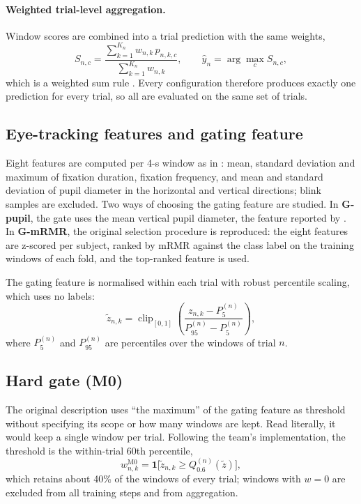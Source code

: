 \documentclass[11pt,a4paper]{article}
\begin{document}
\paragraph{Weighted trial-level aggregation.} Window scores are combined into a trial prediction with the same weights,
\begin{equation}
S_{n,c} = \frac{\sum_{k=1}^{K_n} w_{n,k}\,p_{n,k,c}}{\sum_{k=1}^{K_n} w_{n,k}},\qquad \hat y_n = \arg\max_{c} S_{n,c},
\label{eq:agg}
\end{equation}
which is a weighted sum rule \cite{Kittler1998}. Every configuration therefore produces exactly one prediction for every trial, so all are evaluated on the same set of trials.

\subsection{Eye-tracking features and gating feature}
Eight features are computed per 4-s window as in \cite{FarhadiSedehi2024a}: mean, standard deviation and maximum of fixation duration, fixation frequency, and mean and standard deviation of pupil diameter in the horizontal and vertical directions; blink samples are excluded. Two ways of choosing the gating feature are studied. In \textbf{G-pupil}, the gate uses the mean vertical pupil diameter, the feature reported by \cite{FarhadiSedehi2024a}. In \textbf{G-mRMR}, the original selection procedure is reproduced: the eight features are z-scored per subject, ranked by mRMR against the class label on the training windows of each fold, and the top-ranked feature is used.

The gating feature is normalised within each trial with robust percentile scaling, which uses no labels:
\begin{equation}
\tilde z_{n,k} = \operatorname{clip}_{[0,1]}\left(\frac{z_{n,k}-P_{5}^{(n)}}{P_{95}^{(n)}-P_{5}^{(n)}}\right),
\label{eq:norm}
\end{equation}
where $P_{5}^{(n)}$ and $P_{95}^{(n)}$ are percentiles over the windows of trial $n$.

\subsection{Hard gate (M0)}
The original description uses ``the maximum'' of the gating feature as threshold without specifying its scope or how many windows are kept. Read literally, it would keep a single window per trial. Following the team's implementation, the threshold is the within-trial 60th percentile,
\begin{equation}
w^{\mathrm{M0}}_{n,k} = \mathbf{1}\big[\tilde z_{n,k} \geq Q_{0.6}^{(n)}(\tilde z)\big],
\label{eq:hard}
\end{equation}
which retains about 40\% of the windows of every trial; windows with $w=0$ are excluded from all training steps and from aggregation.
\end{document}
